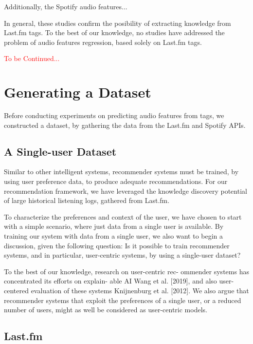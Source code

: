 \documentclass[fleqn,10pt]{olplainarticle}
\begin{document}



Additionally, the Spotify audio features...

In general, these studies confirm the posibility of extracting knowledge from Last.fm tags.
To the best of our knowledge, no studies have addressed the problem of audio features regression, based solely on Last.fm tags.

\textcolor{red}{To be Continued...}

\section*{Generating a Dataset}

Before conducting experiments on predicting audio features from tags, we constructed a dataset, by gathering the data from the Last.fm and Spotify APIs.

\subsection*{A Single-user Dataset}

Similar to other intelligent systems, recommender systems
must be trained, by using user preference data, to produce
adequate recommendations. For our recommendation framework,
we have leveraged the knowledge discovery potential
of large historical listening logs, gathered from Last.fm.

To characterize the preferences and context of the user, we
have chosen to start with a simple scenario, where just data
from a single user is available. By training our system with
data from a single user, we also want to begin a discussion,
given the following question: Is it possible to train 
recommender systems, and in particular, user-centric systems, by
using a single-user dataset?

To the best of our knowledge, research on user-centric rec-
ommender systems has concentrated its efforts on explain-
able AI Wang et al. [2019], and also user-centered evaluation
of these systems Knijnenburg et al. [2012]. We also argue
that recommender systems that exploit the preferences of a
single user, or a reduced number of users, might as well be
considered as user-centric models.


\subsection*{Last.fm}
\end{document}
